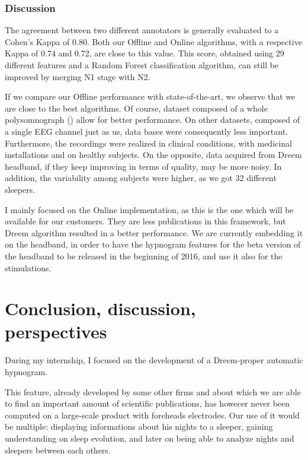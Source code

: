 \documentclass[12pt]{report}
\begin{document}
\subsection{Discussion}

The agreement between two different annotators is generally evaluated to a Cohen's Kappa of 0.80. Both our Offline and Online algorithms, with a respective Kappa of 0.74 and 0.72, are close to this value. This score, obtained using 29 different features and a Random Forest classification algorithm, can still be improved by merging N1 stage with N2.

If we compare our Offline performance with state-of-the-art, we observe that we are close to the best algorithms. Of course, dataset composed of a whole polysomnograph (\cite{liang2012rule}) allow for better performance. On other datasets, composed of a single EEG channel just as us, data bases were consequently less important. Furthermore, the recordings were realized in clinical conditions, with medicinal installations and on healthy subjects. On the opposite, data acquired from Dreem headband, if they keep improving in terms of quality, may be more noisy. In addition, the variability among subjects were higher, as we got 32 different sleepers.

I mainly focused on the Online implementation, as this is the one which will be available for our customers. They are less publications in this framework, but Dreem algorithm resulted in a better performance. We are currently embedding it on the headband, in order to have the hypnogram features for the beta version of the headband to be released in the beginning of 2016, and use it also for the stimulations.   


\chapter*{Conclusion, discussion, perspectives}

During my internship, I focused on the development of a Dreem-proper automatic hypnogram.

This feature, already developed by some other firms and about which we are able to find an important amount of scientific publications, has howecer never been computed on a large-scale product with foreheads electrodes. Our use of it would be multiple: displaying informations about his nights to a sleeper, gaining understanding on sleep evolution, and later on being able to analyze nights and sleepers between each others.
\end{document}
